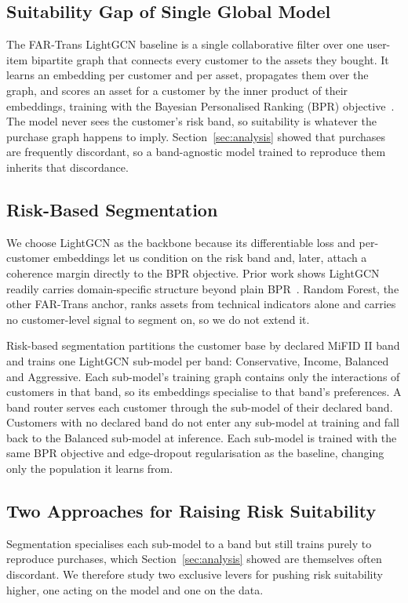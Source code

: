 \subsection{Suitability Gap of Single Global Model}
The FAR-Trans LightGCN baseline is a single collaborative filter over one user-item bipartite graph that connects every customer to the assets they bought. It learns an embedding per customer and per asset, propagates them over the graph, and scores an asset for a customer by the inner product of their embeddings, training with the Bayesian Personalised Ranking (BPR) objective~\cite{rendle2012bprbayesianpersonalizedranking}. The model never sees the customer's risk band, so suitability is whatever the purchase graph happens to imply. Section~\ref{sec:analysis} showed that purchases are frequently discordant, so a band-agnostic model trained to reproduce them inherits that discordance.

\subsection{Risk-Based Segmentation}
We choose LightGCN as the backbone because its differentiable loss and per-customer embeddings let us condition on the risk band and, later, attach a coherence margin directly to the BPR objective. Prior work shows LightGCN readily carries domain-specific structure beyond plain BPR~\cite{Ghiye_2024}. Random Forest, the other FAR-Trans anchor, ranks assets from technical indicators alone and carries no customer-level signal to segment on, so we do not extend it.

Risk-based segmentation partitions the customer base by declared MiFID II band and trains one LightGCN sub-model per band: Conservative, Income, Balanced and Aggressive. Each sub-model's training graph contains only the interactions of customers in that band, so its embeddings specialise to that band's preferences. A band router serves each customer through the sub-model of their declared band. Customers with no declared band do not enter any sub-model at training and fall back to the Balanced sub-model at inference. Each sub-model is trained with the same BPR objective and edge-dropout regularisation as the baseline, changing only the population it learns from.

\subsection{Two Approaches for Raising Risk Suitability}
Segmentation specialises each sub-model to a band but still trains purely to reproduce purchases, which Section~\ref{sec:analysis} showed are themselves often discordant. We therefore study two exclusive levers for pushing risk suitability higher, one acting on the model and one on the data.


